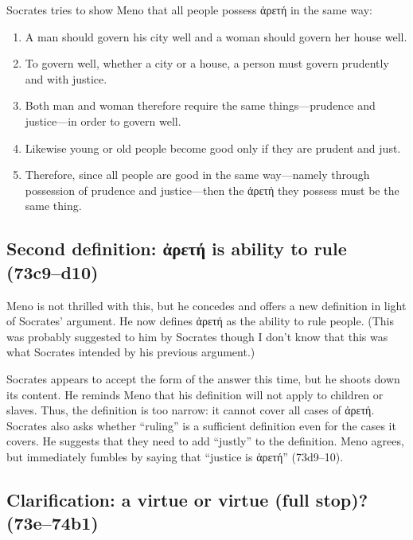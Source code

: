 \documentclass[11pt]{article}
\begin{document}
Socrates tries to show Meno that all people possess {\g ἀρετή} in the same way:

\begin{enumerate}
    \item A man should govern his city well and a woman should govern her house well.
    \item To govern well, whether a city or a house, a person must govern prudently and with justice.
    \item Both man and woman therefore require the same things—prudence and justice—in order to govern well.
    \item Likewise young or old people become good only if they are prudent and just.
    \item Therefore, since all people are good in the same way—namely through possession of prudence and justice---then the {\g ἀρετή} they possess must be the same thing.
\end{enumerate}

\subsection{Second definition: {\g ἀρετή} is ability to rule (73c9--d10)}

Meno is not thrilled with this, but he concedes and offers a new definition in light of Socrates' argument. He now defines {\g ἀρετή} as the ability to rule people. (This was probably suggested to him by Socrates though I don't know that this was what Socrates intended by his previous argument.)

Socrates appears to accept the form of the answer this time, but he shoots down its content. He reminds Meno that his definition will not apply to children or slaves. Thus, the definition is too narrow: it cannot cover all cases of {\g ἀρετή}. Socrates also asks whether ``ruling'' is a sufficient definition even for the cases it covers. He suggests that they need to add ``justly'' to the definition. Meno agrees, but immediately fumbles by saying that ``justice is {\g ἀρετή}'' (73d9--10).

\subsection{Clarification: a virtue or virtue (full stop)? (73e--74b1)}
\end{document}
